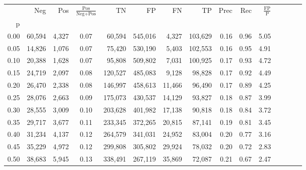 \begin{tabular}{rrrcrrrrrrrrrrr}
\toprule
{} &     Neg &     Pos & $\frac{\text{Pos}}{\text{Neg}+\text{Pos}}$ &       TN &       FP &       FN &       TP &  Prec &   Rec & $\frac{\text{FP}}{\text{P}}$ \\
p    &         &         &                                            &          &          &          &          &       &       &                              \\
\midrule
0.00 &  60,594 &   4,327 &                                       0.07 &   60,594 &  545,016 &    4,327 &  103,629 &  0.16 &  0.96 &                         5.05 \\
0.05 &  14,826 &   1,076 &                                       0.07 &   75,420 &  530,190 &    5,403 &  102,553 &  0.16 &  0.95 &                         4.91 \\
0.10 &  20,388 &   1,628 &                                       0.07 &   95,808 &  509,802 &    7,031 &  100,925 &  0.17 &  0.93 &                         4.72 \\
0.15 &  24,719 &   2,097 &                                       0.08 &  120,527 &  485,083 &    9,128 &   98,828 &  0.17 &  0.92 &                         4.49 \\
0.20 &  26,470 &   2,338 &                                       0.08 &  146,997 &  458,613 &   11,466 &   96,490 &  0.17 &  0.89 &                         4.25 \\
0.25 &  28,076 &   2,663 &                                       0.09 &  175,073 &  430,537 &   14,129 &   93,827 &  0.18 &  0.87 &                         3.99 \\
0.30 &  28,555 &   3,009 &                                       0.10 &  203,628 &  401,982 &   17,138 &   90,818 &  0.18 &  0.84 &                         3.72 \\
0.35 &  29,717 &   3,677 &                                       0.11 &  233,345 &  372,265 &   20,815 &   87,141 &  0.19 &  0.81 &                         3.45 \\
0.40 &  31,234 &   4,137 &                                       0.12 &  264,579 &  341,031 &   24,952 &   83,004 &  0.20 &  0.77 &                         3.16 \\
0.45 &  35,229 &   4,972 &                                       0.12 &  299,808 &  305,802 &   29,924 &   78,032 &  0.20 &  0.72 &                         2.83 \\
0.50 &  38,683 &   5,945 &                                       0.13 &  338,491 &  267,119 &   35,869 &   72,087 &  0.21 &  0.67 &                         2.47 \\

\end{tabular}
